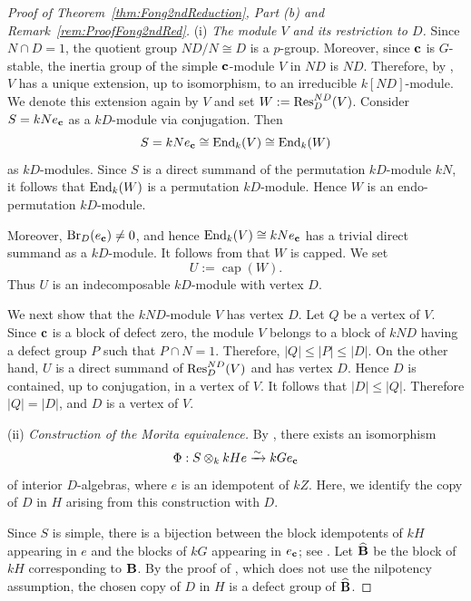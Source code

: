\begin{proof}[Proof of Theorem~\ref{thm:Fong2ndReduction}, Part {\rm(b)} and
Remark~\ref{rem:ProofFong2ndRed}]{\leavevmode}

\smallskip
\noindent
{\rm(i)} \emph{The module $V$ and its restriction to $D$.}
Since $N\cap D=1$, the quotient group $ND/N\cong D$ is a $p$-group. Moreover, since ${\mathbf{c}}$ is $G$-stable, the inertia group of the simple ${\mathbf{c}}$-module $V$ in $ND$ is $ND$. Therefore, by
\cite[Chapter~III, Corollary~3.16]{FeitBook}, $V$ has a unique extension, up to isomorphism, to an irreducible $k[ND]$-module. We denote this extension again by $V$ and set
\( W:=\operatorname{Res}_D^{ND}(V)\). 
Consider $S=kNe_{{\mathbf{c}}}$ as a $kD$-module via conjugation. Then
\[
S=kNe_{{\mathbf{c}}}\cong\operatorname{End}_k(V)\cong\operatorname{End}_k(W)
\]
as $kD$-modules. Since $S$ is a direct summand of the permutation $kD$-module $kN$, it follows that $\operatorname{End}_k(W)$ is a permutation $kD$-module. Hence $W$ is an endo-permutation $kD$-module.

Moreover, $\operatorname{Br}_D(e_{{\mathbf{c}}})\neq0$, and hence $\operatorname{End}_k(V)\cong kNe_{{\mathbf{c}}}$ has a trivial direct summand as a $kD$-module. It follows from \cite[Lemma~2.2]{ThevenazSurvey} that $W$ is capped. We set
\[
U:=\operatorname{cap}(W).
\]
Thus $U$ is an indecomposable $kD$-module with vertex $D$.

We next show that the $kND$-module $V$ has vertex $D$. Let $Q$ be a vertex of $V$. Since ${\mathbf{c}}$ is a block of defect zero, the module $V$ belongs to a block of $kND$ having a defect group $P$ such that $P\cap N=1$. Therefore, $|Q|\leq |P|\leq |D|$. On the other hand, $U$ is a direct summand of $\operatorname{Res}_D^{ND}(V)$ and has vertex $D$. Hence $D$ is contained, up to conjugation, in a vertex of $V$. It
follows that $|D|\leq |Q|$. Therefore $|Q|=|D|$, and $D$ is a vertex of $V$.

\smallskip
\noindent
{\rm(ii)} \emph{Construction of the Morita equivalence.}
By \cite[Section~3]{SalminenSOURCES08}, there exists an isomorphism
\[
\Phi:S\otimes_k kHe\xrightarrow{\sim}kGe_{{\mathbf{c}}}
\]
of interior $D$-algebras, where $e$ is an idempotent of $kZ$. Here, we identify the copy of $D$ in $H$ arising from this construction with $D$.

Since $S$ is simple, there is a bijection between the block idempotents of $kH$ appearing in $e$ and the blocks of $kG$ appearing in $e_{{\mathbf{c}}}$; see
\cite[Section~4]{SalminenSOURCES08}. Let
$\widehat{{\mathbf{B}}}$ be the block of $kH$ corresponding to
${\mathbf{B}}$. By the proof of
\cite[Proposition~4.1]{SalminenSOURCES08}, which does not use the nilpotency assumption, the chosen copy of $D$ in $H$ is a defect group of $\widehat{{\mathbf{B}}}$.


\end{proof}
